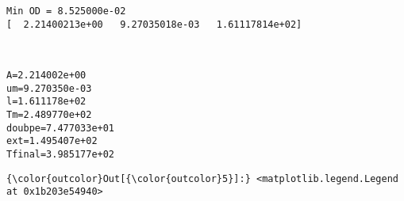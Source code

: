 \documentclass[11pt]{article}
\begin{document}
    \begin{Verbatim}[commandchars=\\\{\}]
Min OD = 8.525000e-02
[  2.21400213e+00   9.27035018e-03   1.61117814e+02]

    \end{Verbatim}

    \begin{center}
    \end{center}
    { \hspace*{\fill} \\}
    
    \begin{Verbatim}[commandchars=\\\{\}]
A=2.214002e+00
um=9.270350e-03
l=1.611178e+02
Tm=2.489770e+02
doubpe=7.477033e+01
ext=1.495407e+02
Tfinal=3.985177e+02

    \end{Verbatim}

            \begin{Verbatim}[commandchars=\\\{\}]
{\color{outcolor}Out[{\color{outcolor}5}]:} <matplotlib.legend.Legend at 0x1b203e54940>
\end{Verbatim}
        
    \begin{center}
    \end{center}
    { \hspace*{\fill} \\}
    
    \begin{center}
    \end{center}
    { \hspace*{\fill} \\}
    
\end{document}
